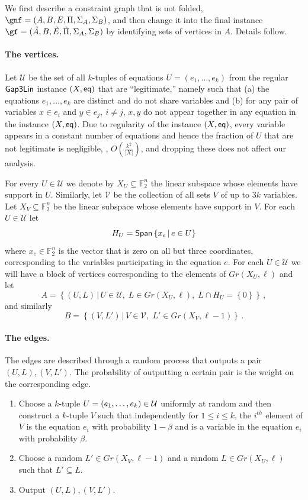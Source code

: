 \documentclass{toc}
\newcommand\set[1]{{\left\{ #1 \right\}}}
\newcommand\Set[2]{ \left\{ #1 \,  \vert  \, #2\right\} }
\newcommand\spn{{\sf Span}}
\renewcommand\leq{\leqslant}
\renewcommand\subset{\subseteq}
\def\F{\mathbb{F}}
\def\U{\mathcal{U}}
\def\V{\mathcal{V}}
\begin{document}
We first describe a constraint graph that is not folded, $\gnf = (A,B,E,\Pi,\Sigma_A,\Sigma_B)$, and then change it into the final instance $\gf = (\tilde A,B,\tilde E,\tilde \Pi,\Sigma_A,\Sigma_B)$ by identifying sets of vertices in $A$. Details follow.

\paragraph{The vertices.}
Let $\U$ be the set of all $k$-tuples of equations
$U = (e_1, \ldots, e_k)$ from the regular ${\sf Gap3Lin}$ instance
$(X, {\sf eq})$ that are ``legitimate,'' namely  such that (a) the
equations $e_1, \ldots, e_k$ are distinct and do not share variables
and (b) for any pair of variables $x \in e_i$ and
$y \in e_j, ~i\not= j$, $x, y$ do not appear together in any equation
in the instance $(X, {\sf eq})$. Due to regularity of the instance
$(X, {\sf eq})$, every variable appears in a constant number of
equations and hence the fraction of $U$ that are not legitimate is
negligible, \ie, $O(\frac{k^2}{|X|})$, and dropping these does not
affect our analysis.

For every $U\in \U$ we denote by
$X_U\subset \F_2^{n}$ the linear subspace  whose elements have support in $U$.
Similarly, let $\V$ be the collection of all sets $V$ of up to $3k$ variables. Let $X_V\subset \F_2^{n}$ be the linear subspace  whose elements have support in $V$. For each $U\in \U$ let
\[ H_U = \spn\Set{x_e}{e\in U} \]
where $x_e\in \F_2^{n}$ is the vector that is zero on all but three coordinates, corresponding to the variables participating in the equation $e$.
For each $U\in \U$ we will have a block of vertices corresponding to
the elements of $Gr(X_U,\ell)$ and let
\[ A = \Set { (U,L) }{ U\in \U,\; L \in  Gr(X_U,\ell), \; L\cap H_U = \set 0}\,,\]
and similarly
\[ B = \Set { (V,L') }{ V\in \V,\; L' \in  Gr(X_V,\ell-1) }\,.\]

\paragraph{The edges.}
The edges are described through a random process that outputs a pair $(U,L),(V,L')$. The probability of outputting a certain pair is the weight on the corresponding edge.
\begin{enumerate}
\item  Choose a $k$-tuple $U = (e_1,\ldots, e_k) \in {\cal U}$ uniformly at random
 and then construct a $k$-tuple $V$ such that independently for $1 \leq i \leq k$, the $i^{th}$ element of
 $V$ is the equation $e_i$ with probability $1-\beta$ and is a variable in the equation $e_i$ with probability $\beta$.
\item Choose a random $L' \in Gr(X_V,\ell-1)$ and a random $L\in Gr(X_U,\ell)$ such that $L'\subset L$.
\item Output $(U,L),(V,L')$.
\end{enumerate}
\end{document}
